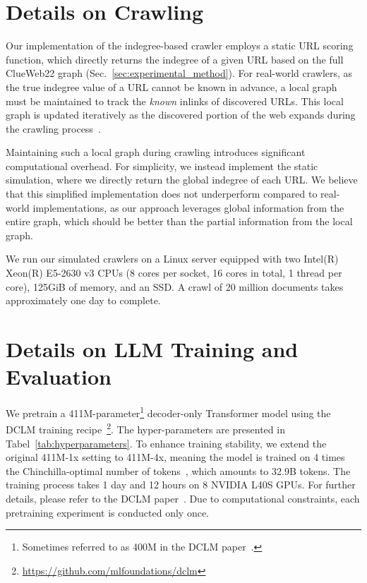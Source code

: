 \appendix

\section{Details on Crawling}
\label{sec:appendix:crawl}

Our implementation of the indegree-based crawler employs a static URL scoring function, which directly returns the indegree of a given URL based on the full ClueWeb22 graph (Sec.~\ref{sec:experimental_method}).  
For real-world crawlers, as the true indegree value of a URL cannot be known in advance, a local graph must be maintained to track the \textit{known} inlinks of discovered URLs.  
This local graph is updated iteratively as the discovered portion of the web expands during the crawling process~\citep{pr-crawl}.  

Maintaining such a local graph during crawling introduces significant computational overhead.  
For simplicity, we instead implement the static simulation, where we directly return the global indegree of each URL.  
We believe that this simplified implementation does not underperform compared to real-world implementations, as our approach leverages global information from the entire graph, which should be better than the partial information from the local graph.

We run our simulated crawlers on a Linux server equipped with two Intel(R) Xeon(R) E5-2630 v3 CPUs (8 cores per socket, 16 cores in total, 1 thread per core), 125GiB of memory, and an SSD.  
A crawl of 20 million documents takes approximately one day to complete.

\section{Details on LLM Training and Evaluation}
\label{sec:appendix:llm}



We pretrain a 411M-parameter\footnote{Sometimes referred to as 400M in the DCLM paper~\citep{dclm}.} decoder-only Transformer model using the DCLM training recipe~\citep{dclm}\footnote{\url{https://github.com/mlfoundations/dclm}}.
The hyper-parameters are presented in Tabel~\ref{tab:hyperparameters}.
To enhance training stability, we extend the original 411M-1x setting to 411M-4x, meaning the model is trained on 4 times the Chinchilla-optimal number of tokens~\citep{chinchilla}, which amounts to 32.9B tokens. 
The training process takes 1 day and 12 hours on 8 NVIDIA L40S GPUs.
For further details, please refer to the DCLM paper~\citep{dclm}.
Due to computational constraints, each pretraining experiment is conducted only once.

